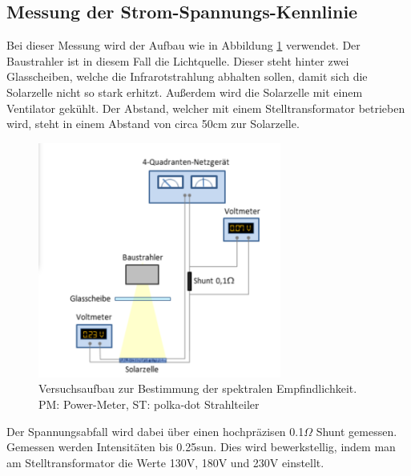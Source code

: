 \subsection{Messung der Strom-Spannungs-Kennlinie}

Bei dieser Messung wird der Aufbau wie in Abbildung \ref{Versuch2} verwendet. Der Baustrahler ist in diesem Fall die Lichtquelle. Dieser steht hinter zwei 
Glasscheiben, welche die Infrarotstrahlung abhalten sollen, damit sich die Solarzelle nicht so stark erhitzt. Außerdem wird die Solarzelle mit 
einem Ventilator gekühlt. Der Abstand, welcher mit einem Stelltransformator betrieben wird, steht in einem Abstand von circa 50cm zur Solarzelle. 
 
\begin{figure}[ht]
    \captionsetup{justification=centering,margin=2cm}
    \centering
    \includegraphics[width =8cm]{Bilder/Versuchsaufbau2.png}
    \caption{Versuchsaufbau zur Bestimmung der spektralen
    Empfindlichkeit. PM: Power-Meter, ST: polka-dot Strahlteiler
    }
    \label{Versuch2}
\end{figure}

Der Spannungsabfall wird dabei über einen hochpräzisen 0.1$\Omega$ Shunt gemessen. 
Gemessen werden Intensitäten bis 0.25sun. Dies wird bewerkstellig, indem man am Stelltransformator die Werte 130V, 180V und 230V einstellt.


